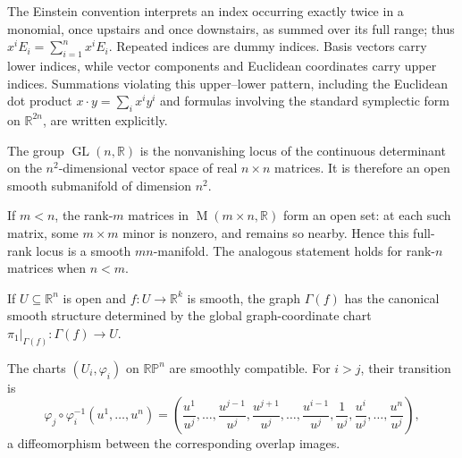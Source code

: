 \begin{notation}
\label{not:1-4-extra-1}
\mathlibok
The Einstein convention interprets an index occurring exactly twice in a
monomial, once upstairs and once downstairs, as summed over its full range;
thus $x^iE_i=\sum_{i=1}^n x^iE_i$. Repeated indices are dummy indices. Basis
vectors carry lower indices, while vector components and Euclidean coordinates
carry upper indices. Summations violating this upper--lower pattern, including
the Euclidean dot product $x\cdot y=\sum_i x^iy^i$ and formulas involving the
standard symplectic form on $\mathbb R^{2n}$, are written explicitly.
\end{notation}

\begin{example}
\label{ex:1-27}
\mathlibok
{}
The group $\operatorname{GL}(n,\mathbb R)$ is the nonvanishing locus of the
continuous determinant on the $n^2$-dimensional vector space of real
$n\times n$ matrices. It is therefore an open smooth submanifold of dimension
$n^2$.
\end{example}

\begin{example}
\label{ex:1-28}
\leanok
{}
If $m<n$, the rank-$m$ matrices in
$\operatorname M(m\times n,\mathbb R)$ form an open set: at each such matrix,
some $m\times m$ minor is nonzero, and remains so nearby. Hence this full-rank
locus is a smooth $mn$-manifold. The analogous statement holds for rank-$n$
matrices when $n<m$.
\end{example}

\begin{example}
\label{ex:1-30}
\leanok
{}
If $U\subseteq\mathbb R^n$ is open and $f:U\to\mathbb R^k$ is smooth, the
graph $\Gamma(f)$ has the canonical smooth structure determined by the global
graph-coordinate chart $\pi_1|_{\Gamma(f)}:\Gamma(f)\to U$.
\end{example}

\begin{example}
\label{ex:1-33}
\leanok
{}
The charts $(U_i,\varphi_i)$ on $\mathbb{RP}^n$ are smoothly compatible. For
$i>j$, their transition is
\[
\varphi_j\circ\varphi_i^{-1}(u^1,\ldots,u^n)
=\left(\frac{u^1}{u^j},\ldots,\frac{u^{j-1}}{u^j},
\frac{u^{j+1}}{u^j},\ldots,\frac{u^{i-1}}{u^j},
\frac1{u^j},\frac{u^i}{u^j},\ldots,\frac{u^n}{u^j}\right),
\]
a diffeomorphism between the corresponding overlap images.
\end{example}

